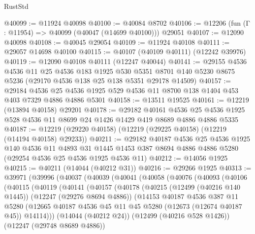 \begin{lexlean}{RustStd}
\begin{coremodule}
@40099 := @11924 @40098
@40100 := @40084 @8702
@40106 := @12206 (fun (Γ : @11954) => @40099 (@40047 (@14699 @40100))) @29051
@40107 := @12090 @40098
@40108 := @40045 @29054
@40109 := @11924 @40108
@40111 := @29057 @14698 @40100
@40115 := @40107 (@40109 @40111) (@12242 @39976)
@40119 := @12090 @40108 @40111 (@12247 @40044)
@40141 := @29155
    @4536
    @4536
    @11
    @25
    @4536
    @183
    @1925
    @530
    @5351
    @8701
    @140
    @5230
    @8675
    @5236
    (@29170 @4536 @138 @25 @138 @5351 @29178 @14509)
@40157 := @29184
    @4536
    @25
    @4536
    @1925
    @529
    @4536
    @11
    @8700
    @138
    @1404
    @453
    @403
    @7329
    @4886
    @4886
    @5301
@40158 := @13511 @19525
@40161 := @12219 (@13894 @40158) @29201
@40178 := @29182
    @40161
    @4536
    @25
    @4536
    @1925
    @528
    @4536
    @11
    @8699
    @24
    @1426
    @1429
    @419
    @8689
    @4886
    @4886
    @5335
@40187 := @12219 (@29220 @40158) (@12219 (@29225 @40158) (@12219 (@14194 @40158) @29233))
@40211 := @29182
    @40187
    @4536
    @25
    @4536
    @1925
    @140
    @4536
    @11
    @4893
    @31
    @1445
    @1453
    @387
    @8694
    @4886
    @4886
    @5280
    (@29254 @4536 @25 @4536 @1925 @4536 @11)
@40212 := @14056 @1925
@40215 := @40211 (@14044 (@40212 @31))
@40216 := @29266 @1925
@40313 := @39971
    (@39996
      (@40037
        (@40039
          (@40041
            (@40058
              (@40076
                (@40093
                  (@40106
                    (@40115
                      (@40119
                        (@40141
                          (@40157
                            (@40178
                              (@40215
                                (@12499 (@40216 @140 @1445))
                                (@12247 (@29276 @8694 @4886))
                                (@14153
                                  @40187
                                  @4536
                                  @387
                                  @11
                                  @5280
                                  (@12665
                                    @40187
                                    @4536
                                    @45
                                    @11
                                    @45
                                    @5280
                                    (@12673 (@12674 @40187 @45))
                                    @14114)))
                              (@14044 (@40212 @24))
                              (@12499 (@40216 @528 @1426))
                              (@12247 (@29748 @8689 @4886))

\end{coremodule}
\end{lexlean}
